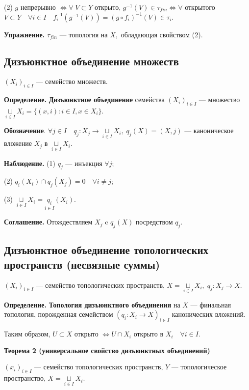 \documentclass[12pt,a4paper]{article}
\begin{document}
(2) $g$ непрерывно $\Leftrightarrow \forall \; V \subset Y$ открыто, $g^{-1}(V) \in \tau_{fin} \Leftrightarrow \forall$ открытого $V \subset Y \quad \forall i \in I \quad f_{i}^{-1}(g^{-1}(V)) = (g \circ f_{i})^{-1}(V) \in \tau_{i}.$ 

\textbf{Упражнение.} $\tau_{fin}$ --- топология на $X,$ обладающая свойством (2).

\subsection{Дизъюнктное объединение множеств}

$(X_{i})_{i \in I}$ --- семейство множеств. 

\textbf{Определение.} \textbf{Дизъюнктное объединение} семейства $(X_{i})_{i \in I}$ --- множество $\underset{i \in I}{\sqcup} X_{i} = \{(x, i): i \in I, x \in X_{i}\}.$ 

\textbf{Обозначение}. $\forall j \in I \quad q_{j}: X_{j} \to \underset{i \in I}{\sqcup} X_{i}, \; q_{j}(X) = (X, j)$ --- каноническое вложение $X_{j}$ в $\underset{i \in I}{\sqcup} X_{i}.$ 

\textbf{Наблюдение.} (1) $q_{j}$ --- инъекция $\forall j;$ 

(2) $q_{i} (X_{i}) \cap q_{j}(X_{j}) = 0 \quad \forall i \neq j;$

(3) $\underset{i \in I}{\sqcup} X_{i} = \underset{i \in I}{q_{i}} (X_{i}).$

\textbf{Соглашение.} Отождествляем $X_{j}$ c $q_{j}(X)$ посредством $q_{j}.$

\subsection{Дизъюнктное объединение топологических пространств (несвязные суммы)}

$(X_{i})_{i \in I}$ --- семейство топологических пространств, $X = \underset{i \in I}{\sqcup} X_{i}, \; q_{j}\!\!: X_{j} \to X.$

\textbf{Определение.} \textbf{Топология дизъюнктного объединения} на $X$ --- финальная топология, порожденная семейством $(q_{i}\!\!: X_{i} \to X)_{i \in I}$ канонических вложений.

Таким образом, $U \subset X$ открыто $\Leftrightarrow U \cap X_{i}$ открыто в $X_{i} \quad \forall i \in I.$ 

\textbf{Теорема 2 (универсальное свойство дизъюнктных объединений)}

$(x_{i})_{i \in I}$ --- семейство топологических пространств, $Y$ --- топологическое пространство, $X = \underset{i \in I}{\sqcup} X_{i}.$ 
\end{document}
